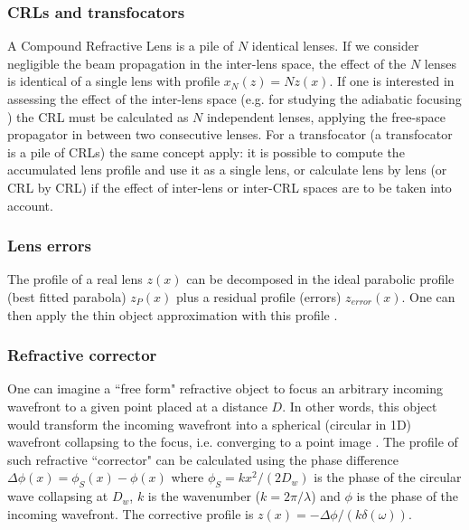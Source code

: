 \documentclass{iucr}              %
\begin{document}
\subsubsection{CRLs and transfocators}
A Compound Refractive Lens is a pile of $N$ identical lenses. If we consider negligible the beam propagation in the inter-lens space, the effect of the $N$ lenses is identical of a single lens with profile $x_N(z)=N z(x)$. If one is interested in assessing the effect of the inter-lens space (e.g. for studying the adiabatic focusing \cite{Schroer_adiabatic}) the CRL must be calculated as $N$ independent lenses, applying the free-space propagator in between two consecutive lenses. For a transfocator (a transfocator is a pile of CRLs) the same concept apply: it is possible to compute the accumulated lens profile and use it as a single lens, or calculate lens by lens (or CRL by CRL) if the effect of inter-lens or inter-CRL spaces are to be taken into account.

\subsubsection{Lens errors}
The profile of a real lens $z(x)$ can be decomposed in the ideal parabolic profile (best fitted parabola) $z_P(x)$ plus a residual profile (errors) $z_{error}(x)$. One can then apply the thin object approximation with this profile \cite{Celestre:mo5214}. 

\subsubsection{Refractive corrector}
\label{sec:refractorCorrector}
One can imagine a ``free form" refractive object to focus an arbitrary incoming wavefront to a given point placed at a distance $D$. In other words, this object would transform the incoming wavefront into a spherical (circular in 1D) wavefront collapsing to the focus, i.e. converging to a point image \cite{ChubarElleaumeSnigirev2001}. The profile of such refractive ``corrector"  can be calculated using the phase difference $\Delta\phi(x)=\phi_S(x)-\phi(x)$ where $\phi_S=k x^2 / (2 D_w)$ is the phase of the circular wave collapsing at $D_w$, $k$ is the wavenumber ($k=2\pi/\lambda$) and $\phi$ is the phase of the incoming wavefront. The corrective profile is $z(x)=-\Delta\phi/(k \delta(\omega))$.


\end{document}
